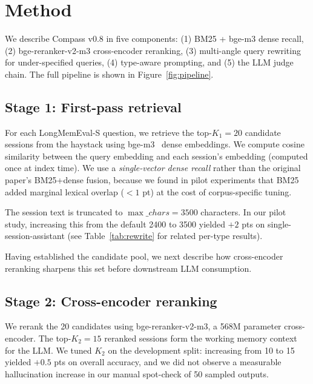 
\section{Method}
\label{sec:method}

We describe Compass v0.8 in five components: (1) BM25 + bge-m3 dense recall,
(2) bge-reranker-v2-m3 cross-encoder reranking, (3) multi-angle query rewriting
for under-specified queries, (4) type-aware prompting, and (5) the LLM judge
chain. The full pipeline is shown in Figure~\ref{fig:pipeline}.

\subsection{Stage 1: First-pass retrieval}

For each LongMemEval-S question, we retrieve the top-\(K_1=20\) candidate
sessions from the haystack using bge-m3~\citep{chen2024bge} dense embeddings.
We compute cosine similarity between the query embedding and each session's
embedding (computed once at index time). We use a \emph{single-vector dense
recall} rather than the original paper's BM25+dense fusion, because we found
in pilot experiments that BM25 added marginal lexical overlap (\(<1\) pt) at
the cost of corpus-specific tuning.

The session text is truncated to \(\max\_chars = 3500\) characters. In our
pilot study, increasing this from the default 2400 to 3500 yielded
\(+2\) pts on single-session-assistant (see Table~\ref{tab:rewrite} for
related per-type results).

Having established the candidate pool, we next describe how cross-encoder
reranking sharpens this set before downstream LLM consumption.

\subsection{Stage 2: Cross-encoder reranking}

We rerank the 20 candidates using bge-reranker-v2-m3, a 568M parameter
cross-encoder. The top-\(K_2=15\) reranked sessions form the working memory
context for the LLM. We tuned \(K_2\) on the development split: increasing
from 10 to 15 yielded \(+0.5\) pts on overall accuracy, and we did not
observe a measurable hallucination increase in our manual spot-check of
50 sampled outputs.

